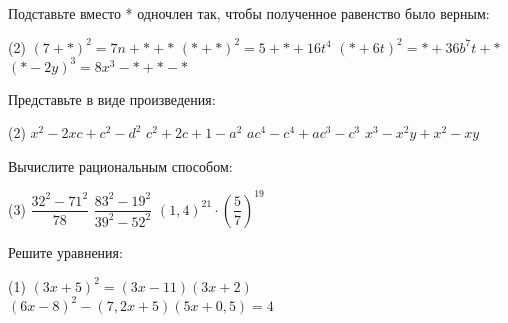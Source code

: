 \begin{exam}
	\begin{listofex}
		\item Подставьте вместо * одночлен так, чтобы полученное равенство было верным:
		\begin{tasks}(2)
			\task \( (7+*)^2=7n+*+* \)
			\task \( (*+*)^2=5+*+16t^4 \)
			\task \( (*+6t)^2=*+36b^7t+* \)
			\task \( (*-2y)^3=8x^3-*+*-* \)
		\end{tasks}
		
		\item Представьте в виде произведения:
		\begin{tasks}(2)
			\task \( x^2-2xc+c^2-d^2 \)
			\task \( c^2+2c+1-a^2 \)
			\task \( ac^4-c^4+ac^3-c^3 \)
			\task \( x^3-x^2y+x^2-xy \)
		\end{tasks}
		\item Вычислите рациональным способом:
		\begin{tasks}(3)
			\task \( \dfrac{32^2-71^2}{78}  \)
			\task \( \dfrac{83^2-19^2}{39^2-52^2} \)
			\task \( (1,4)^{21} \cdot \left( \dfrac{5}{7} \right)^{19} \)
		\end{tasks}
		\item Решите уравнения:
		\begin{tasks}(1)
			\task \( (3x+5)^2= (3x-11)(3x+2) \)
			\task \( (6x-8)^2 - (7,2x+5)(5x+0,5)=4 \)
		\end{tasks}
	\end{listofex}
\end{exam}
